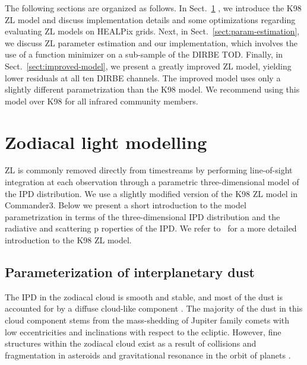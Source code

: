 \documentclass[twocolumn]{aa}
\begin{document}
The following sections are organized as follows. In Sect.~\ref{sect:zodi-model}
, we introduce the K98 ZL model and discuss 
implementation details and some optimizations regarding evaluating ZL 
models on HEALPix grids. Next, in Sect.~\ref{sect:param-estimation}, we 
discuss ZL parameter estimation and our implementation, which involves 
the use of a function minimizer on a sub-sample of the DIRBE TOD. 
Finally, in Sect.~\ref{sect:improved-model}, we present a greatly 
improved ZL model, yielding lower residuals at all ten DIRBE channels. 
The improved model uses only a slightly different parametrization than 
the K98 model. We recommend using this model over K98 for all infrared 
community members.


\section{Zodiacal light modelling}\label{sect:zodi-model}
ZL is commonly removed directly from timestreams by performing 
line-of-sight integration at each observation through a parametric 
three-dimensional model of the IPD distribution. We use a slightly 
modified version of the K98 ZL model in Commander3. Below we present a 
short introduction to the model parametrization in terms of the 
three-dimensional IPD distribution and the radiative and scattering p
roperties of the IPD. We refer to~\cite{Kelsall1998} for a more detailed 
introduction to the K98 ZL model.


\subsection{Parameterization of interplanetary dust}
The IPD in the zodiacal cloud is smooth and stable, and most of the dust 
is accounted for by a diffuse cloud-like component \citep{Leinert1998}. 
The majority of the dust in this cloud component stems from the 
mass-shedding of Jupiter family comets with low eccentricities and 
inclinations with respect to the ecliptic. However, fine structures 
within the zodiacal cloud exist as a result of collisions and 
fragmentation in asteroids and gravitational resonance in the orbit of 
planets \citep{Low1984, Dermott1984, Dermott1994, Reach1997}. 
\end{document}
